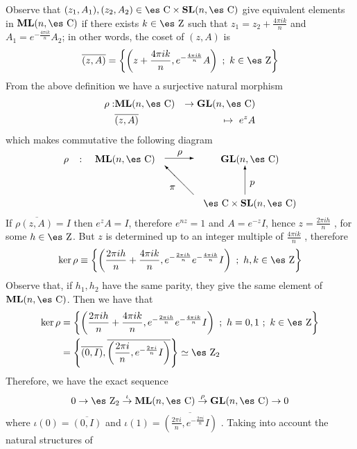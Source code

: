 \documentclass[12pt]{article}
\def\beq{\begin{equation}}
\def\eeq{\end{equation}}
\def\beann{\begin{eqnarray*}}
\def\eeann{\end{eqnarray*}}
\def\dst{\(}
\def\map#1{\mathrel{\mathop{\to}\limits^{#1}}}
\def\GL{{\bf GL}(n,\Complex )}
\def\SL{{\bf SL}(n,\Complex )}
\def\ML{{\bf ML}(n,\Complex )}
\def\Zahl{\mbox{\es Z}}
\def\Complex{\mbox{\es C}}
\begin{document}
Observe that $(z_1,A_1),(z_2,A_2)\in\Complex\times\SL$
 give equivalent elements in $\ML$ if there exists $k \in \Zahl$ such
that
\dst z_1 = z_2 + \frac{4\pi i k}{n}\) and $A_1=e^{-\frac{4\pi i
k}{n}}A_2$;
in other words, the coset of $(z,A)$ is
 $$
 \overline{(z,A)} =\left\{ \left( z + \frac{4\pi i k}{n} ,
 e^{-\frac{4\pi i k}{n}}A\right) \ ;
 \ k \in \Zahl\right\}
 $$
  From the above definition we have a surjective natural morphism
\beann
\rho : &\ML& \to \GL
\\
&\overline{(z,A)}& \mapsto \ e^{z}A
\eeann
which makes commutative the following diagram
$$
\begin{array}{ccccc}
\rho & \colon & \ML &
\begin{picture}(30,10)(0,0)
\put(13,8){\mbox{$\rho$}}
\put(0,4){\vector(1,0){30}}
\end{picture}
&\GL
\\
& & &
\begin{picture}(30,30)(0,0)
\put(5,5){\mbox{$\pi$}}
\put(30,0){\vector(-1,1){30}}
\end{picture}
&
\begin{picture}(10,30)(0,0)
\put(5,10){\mbox{$p$}}
\put(0,0){\vector(0,1){30}}
\end{picture}
\\
& & & &\Complex \times \SL
\end{array}
$$ 
If $\rho\overline{(z,A)} = I$ then $e^{z}A = I$, therefore
$e^{nz} = 1$ and $A = e^{-z}I$, hence \dst z = \frac{2\pi i
h}{n}\) , for some $h \in \Zahl$. But $z$ is determined up to an
integer multiple of \dst \frac{4\pi i k}{n}\) , therefore $$ \ker
\rho \equiv\left\{ \left(\frac{2\pi i h}{n} + \frac{4\pi i k}{n},
e^{-\frac{2\pi i h}{n}} e^{-\frac{4\pi i k}{n}}I \right) \ ; \ h,k
\in \Zahl \right\} $$ 
Observe that, if $h_1,h_2$ have the same
parity, they give the same element of $\ML$. Then we have that 
\begin{align*}
\ker \rho&= \left\{ \left(\frac{2\pi i h}{n} + \frac{4\pi i k}{n},
e^{-\frac{2\pi i h}{n}} e^{-\frac{4\pi i k}{n}}I \right) \ ; \
h=0,1 \ ; \ k \in \Zahl \right\}\\
& = \left\{ \overline{(0,I)},
\overline{\left(\frac{2\pi i}{n},e^{-\frac{2\pi i}{n}}I\right)}
\right\} \simeq \Zahl_2
\end{align*}
Therefore, we have the exact sequence
\beq 0 \map{} \Zahl_2 \map{\iota} \ML \map{\rho} \GL \map{} 0
\label{es3} \eeq where \dst \iota (0) = \overline{(0,I)}\) and
\dst\iota (1)=\overline{\left(\frac{2\pi i}{n},e^{-\frac{2\pi
i}{n}}I\right)}\) . Taking into account the natural structures of
\end{document}
